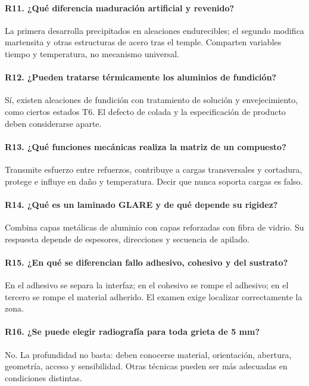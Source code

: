\paragraph{R11. ¿Qué diferencia maduración artificial y revenido?} La primera desarrolla precipitados en aleaciones endurecibles; el segundo modifica martensita y otras estructuras de acero tras el temple. Comparten variables tiempo y temperatura, no mecanismo universal.

\paragraph{R12. ¿Pueden tratarse térmicamente los aluminios de fundición?} Sí, existen aleaciones de fundición con tratamiento de solución y envejecimiento, como ciertos estados T6. El defecto de colada y la especificación de producto deben considerarse aparte.

\paragraph{R13. ¿Qué funciones mecánicas realiza la matriz de un compuesto?} Transmite esfuerzo entre refuerzos, contribuye a cargas transversales y cortadura, protege e influye en daño y temperatura. Decir que nunca soporta cargas es falso.

\paragraph{R14. ¿Qué es un laminado GLARE y de qué depende su rigidez?} Combina capas metálicas de aluminio con capas reforzadas con fibra de vidrio. Su respuesta depende de espesores, direcciones y secuencia de apilado.

\paragraph{R15. ¿En qué se diferencian fallo adhesivo, cohesivo y del sustrato?} En el adhesivo se separa la interfaz; en el cohesivo se rompe el adhesivo; en el tercero se rompe el material adherido. El examen exige localizar correctamente la zona.

\paragraph{R16. ¿Se puede elegir radiografía para toda grieta de 5 mm?} No. La profundidad no basta: deben conocerse material, orientación, abertura, geometría, acceso y sensibilidad. Otras técnicas pueden ser más adecuadas en condiciones distintas.

